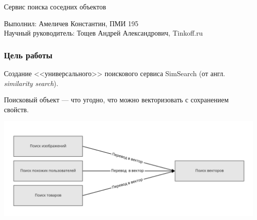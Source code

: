 \documentclass{beamer}
\begin{document}
\date{25 июня, 2022}


\begin{frame}
\begin{center}


{\large \scshape

\bigskip

\bigskip

Сервис поиска соседних объектов

\bigskip
\bigskip
\bigskip
\bigskip
\bigskip
\bigskip
}



Выполнил: Амеличев Константин, ПМИ 195\\
\bigskip
Научный руководитель: Тощев Андрей Александрович, Tinkoff.ru


\end{center}
\end{frame}






\begin{frame}

\frametitle{Цель работы}

Создание <<универсального>> поискового сервиса SimSearch (от англ. \textit{similarity search}).

\bigskip

Поисковый объект --- что угодно, что можно векторизовать с сохранением свойств.

\begin{center}
\includegraphics[width=0.8\linewidth]{search_problem_approach.png}
\end{center}


\end{frame}
\end{document}
